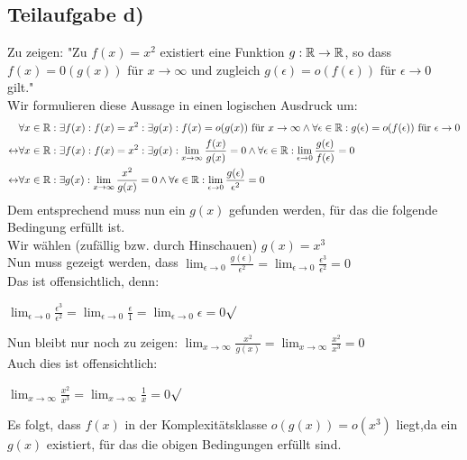 \documentclass{llncs}
\begin{document}
\subsection*{Teilaufgabe d)}
Zu zeigen: "Zu $f(x)=x^2$ existiert eine Funktion $g : \mathbb{R} \rightarrow \mathbb{R}$, so dass $f(x)= 0(g(x))$ für $x \to \infty$ und zugleich $g(\epsilon)=o(f(\epsilon))$ für $ \epsilon \to 0$ gilt."\\
Wir formulieren diese Aussage in einen logischen Ausdruck um:
\begin{align*}
&\forall x \in \mathbb{R} :\exists f(x): f(x)=x^2 : \exists g(x) : f(x)=o(g(x)) \text{ für } x \to \infty \wedge \forall \epsilon \in \mathbb{R}: g(\epsilon)=o(f(\epsilon)) \text{ für } \epsilon \to 0\\
\leftrightarrow&
\forall x \in \mathbb{R} :\exists f(x): f(x)=x^2 : \exists g(x) : \lim_{x \to \infty}{\frac{f(x)}{g(x)}}=0 \wedge \forall \epsilon \in \mathbb{R}:\lim_{\epsilon \to 0}{\frac{g(\epsilon)}{f(\epsilon)}}=0 \\
\leftrightarrow&
\forall x \in \mathbb{R} : \exists g(x) : \lim_{x \to \infty}{\frac{x^2}{g(x)}}=0 \wedge \forall \epsilon \in \mathbb{R}:\lim_{\epsilon \to 0}{\frac{g(\epsilon)}{\epsilon^2}}=0 
\end{align*}
Dem entsprechend muss nun ein $g(x)$ gefunden werden, für das die folgende Bedingung erfüllt ist.\\
Wir wählen (zufällig bzw. durch Hinschauen) $g(x)=x^3$\\
Nun muss gezeigt werden, dass $\lim_{\epsilon \to 0}{\frac{g(\epsilon)}{\epsilon^2}}=\lim_{\epsilon \to 0}{\frac{\epsilon^3}{\epsilon^2}}=0$\\
Das ist offensichtlich, denn: 
\begin{center}
$\lim_{\epsilon \to 0}{\frac{\epsilon^3}{\epsilon^2}}
=\lim_{\epsilon \to 0}{\frac{\epsilon}{1}}
=\lim_{\epsilon \to 0}{\epsilon} =0 $\hfil $\surd$
\end{center}
Nun bleibt nur noch zu zeigen: $\lim_{x \to \infty}{\frac{x^2}{g(x)}}=\lim_{x \to \infty}{\frac{x^2}{x^3}}=0$\\
Auch dies ist offensichtlich:
\begin{center}
$\lim_{x \to \infty}{\frac{x^2}{x^3}}
=\lim_{x \to \infty}{\frac{1}{x}} = 0 $\hfil $\surd$
\end{center}
Es folgt, dass $f(x)$ in der Komplexitätsklasse $o(g(x))=o(x^3)$ liegt,da ein $g(x)$ existiert, für das die obigen Bedingungen erfüllt sind.
\end{document}
